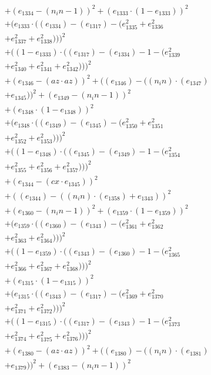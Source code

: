 \documentclass[10pt, a4paper]{article}
\begin{document}
\begin{align*}
& + (e_{1334} - (n_in - 1))^{2} + (e_{1333}  \cdot  (1 - e_{1333}))^{2} \\
& + (e_{1333}  \cdot  ((e_{1334}) - (e_{1317}) - (e_{1335}^{2} + e_{1336}^{2} \\
& + e_{1337}^{2} + e_{1338}^{2})))^{2} \\
& + ((1 - e_{1333})  \cdot  ((e_{1317}) - (e_{1334}) - 1 - (e_{1339}^{2} \\
& + e_{1340}^{2} + e_{1341}^{2} + e_{1342}^{2})))^{2} \\
& + (e_{1346} - (az  \cdot  az))^{2} + ((e_{1346}) - ((n_in)  \cdot  (e_{1347}) \\
& + e_{1345}))^{2} + (e_{1349} - (n_in - 1))^{2} \\
& + (e_{1348}  \cdot  (1 - e_{1348}))^{2} \\
& + (e_{1348}  \cdot  ((e_{1349}) - (e_{1345}) - (e_{1350}^{2} + e_{1351}^{2} \\
& + e_{1352}^{2} + e_{1353}^{2})))^{2} \\
& + ((1 - e_{1348})  \cdot  ((e_{1345}) - (e_{1349}) - 1 - (e_{1354}^{2} \\
& + e_{1355}^{2} + e_{1356}^{2} + e_{1357}^{2})))^{2} \\
& + (e_{1344} - (cx  \cdot  e_{1345}))^{2} \\
& + ((e_{1344}) - ((n_in)  \cdot  (e_{1358}) + e_{1343}))^{2} \\
& + (e_{1360} - (n_in - 1))^{2} + (e_{1359}  \cdot  (1 - e_{1359}))^{2} \\
& + (e_{1359}  \cdot  ((e_{1360}) - (e_{1343}) - (e_{1361}^{2} + e_{1362}^{2} \\
& + e_{1363}^{2} + e_{1364}^{2})))^{2} \\
& + ((1 - e_{1359})  \cdot  ((e_{1343}) - (e_{1360}) - 1 - (e_{1365}^{2} \\
& + e_{1366}^{2} + e_{1367}^{2} + e_{1368}^{2})))^{2} \\
& + (e_{1315}  \cdot  (1 - e_{1315}))^{2} \\
& + (e_{1315}  \cdot  ((e_{1343}) - (e_{1317}) - (e_{1369}^{2} + e_{1370}^{2} \\
& + e_{1371}^{2} + e_{1372}^{2})))^{2} \\
& + ((1 - e_{1315})  \cdot  ((e_{1317}) - (e_{1343}) - 1 - (e_{1373}^{2} \\
& + e_{1374}^{2} + e_{1375}^{2} + e_{1376}^{2})))^{2} \\
& + (e_{1380} - (az  \cdot  az))^{2} + ((e_{1380}) - ((n_in)  \cdot  (e_{1381}) \\
& + e_{1379}))^{2} + (e_{1383} - (n_in - 1))^{2} \\

\end{align*}
\end{document}
